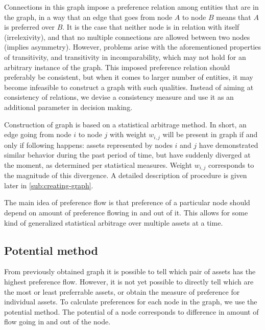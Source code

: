 \documentclass[letterpaper, 10 pt, conference]{ieeeconf}
\begin{document}
  Connections in this graph impose a preference relation among entities that are in the graph, in a way that an edge that goes from node $A$ to node $B$ means that $A$ is preferred over $B$.
  It is the case that neither node is in relation with itself (irrelexivity), and that no multiple connections are allowed between two nodes (implies asymmetry).
  However, problems arise with the aforementioned properties of transitivity, and transitivity in incomparability, which may not hold for an arbitrary instance of the graph.
  This imposed preference relation should preferably be consistent, but when it comes to larger number of entities, it may become infeasible to construct a graph with such qualities.
  Instead of aiming at consistency of relations, we devise a consistency measure and use it as an additional parameter in decision making.
  
  Construction of graph is based on a statistical arbitrage method.
  In short, an edge going from node $i$ to node $j$ with weight $w_{i,j}$ will be present in graph if and only if following happens: assets represented by nodes $i$ and $j$ have demonstrated similar behavior during the past period of time, but have suddenly diverged at the moment, as determined per statistical measures.
  Weight $w_{i,j}$ corresponds to the magnitude of this divergence.  
  A detailed description of procedure is given later in \ref{sub:creating-graph}.
  
%  

  The main idea of preference flow is that preference of a particular node should depend on amount of preference flowing in and out of it.
  This allows for some kind of generalized statistical arbitrage over multiple assets at a time.
   
  \subsection{Potential method}
  \label{sub:potential}
  From previously obtained graph it is possible to tell which pair of assets has the highest preference flow.
  However, it is not yet possible to directly tell which are the most or least preferrable assets, or obtain the measure of preference for individual assets.
  To calculate preferences for each node in the graph, we use the potential method\cite{caklovic}.
  The potential of a node corresponds to difference in amount of flow going in and out of the node.
  
\end{document}
